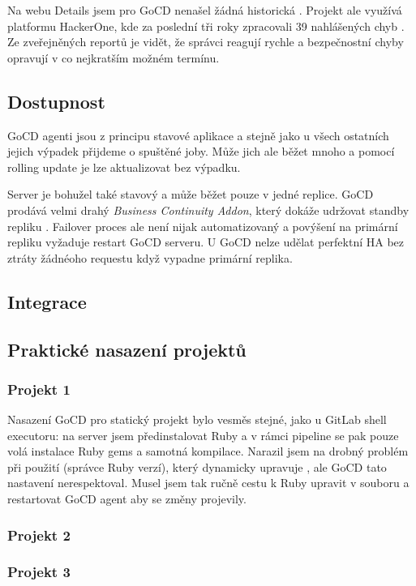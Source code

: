         Na webu  Details jsem pro GoCD nenašel žádná historická . Projekt ale využívá platformu HackerOne, kde za poslední tři roky zpracovali 39 nahlášených chyb \cite{gocd-hackerone}. Ze zveřejněných reportů je vidět, že správci reagují rychle a bezpečnostní chyby opravují v co nejkratším možném termínu.

    \subsection{Dostupnost}
        GoCD agenti jsou z principu stavové aplikace a stejně jako u všech ostatních \CI jejich výpadek přijdeme o spuštěné joby. Může jich ale běžet mnoho a pomocí rolling update je lze aktualizovat bez výpadku.

        Server je bohužel také stavový a může běžet pouze v jedné replice. GoCD prodává velmi drahý \textit{Business Continuity Addon}, který dokáže udržovat standby repliku \cite{gocd-ha}. Failover proces ale není nijak automatizovaný a povýšení na primární repliku vyžaduje restart GoCD serveru. U GoCD nelze udělat perfektní HA bez ztráty žádnéoho requestu když vypadne primární replika.

        \blind[1]

    \subsection{Integrace}
        \blind[2]
        \blind[5]

    \subsection{Praktické nasazení projektů}
        \subsubsection{Projekt 1}
            Nasazení GoCD pro statický projekt bylo vesměs stejné, jako u GitLab shell executoru: na server jsem předinstalovat Ruby a v rámci pipeline se pak pouze volá instalace Ruby gems a samotná kompilace. Narazil jsem na drobný problém při použití  (správce Ruby verzí), který dynamicky upravuje , ale GoCD tato nastavení nerespektoval. Musel jsem tak ručně cestu k Ruby upravit v souboru  a restartovat GoCD agent aby se změny projevily.

        \subsubsection{Projekt 2}
            \blind[2]

        \subsubsection{Projekt 3}
            \blind[2]
